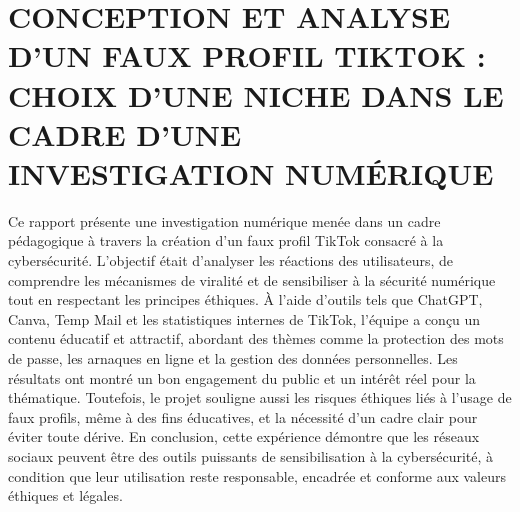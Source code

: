 \documentclass[memoire, 12pt]{report}
\begin{document}
\section{CONCEPTION ET ANALYSE D’UN FAUX PROFIL
TIKTOK : CHOIX D’UNE NICHE DANS LE CADRE
D’UNE INVESTIGATION NUMÉRIQUE}
Ce rapport présente une investigation numérique menée dans un cadre pédagogique à travers la création d’un faux profil TikTok consacré à la cybersécurité. L’objectif était d’analyser les réactions des utilisateurs, de comprendre les mécanismes de viralité et de sensibiliser à la sécurité numérique tout en respectant les principes éthiques. À l’aide d’outils tels que ChatGPT, Canva, Temp Mail et les statistiques internes de TikTok, l’équipe a conçu un contenu éducatif et attractif, abordant des thèmes comme la protection des mots de passe, les arnaques en ligne et la gestion des données personnelles. Les résultats ont montré un bon engagement du public et un intérêt réel pour la thématique. Toutefois, le projet souligne aussi les risques éthiques liés à l’usage de faux profils, même à des fins éducatives, et la nécessité d’un cadre clair pour éviter toute dérive. En conclusion, cette expérience démontre que les réseaux sociaux peuvent être des outils puissants de sensibilisation à la cybersécurité, à condition que leur utilisation reste responsable, encadrée et conforme aux valeurs éthiques et légales.
\end{document}
